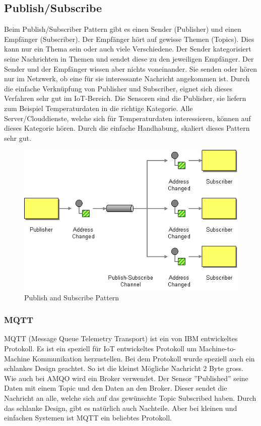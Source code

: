 \subsection{Publish/Subscribe}
Beim Publish/Subscriber Pattern gibt es einen Sender (Publisher) und einen Empfänger (Subscriber). Der Empfänger hört auf gewisse Themen (Topics). Dies kann nur ein Thema sein oder auch viele Verschiedene. Der Sender kategorisiert seine Nachrichten in Themen und sendet diese zu den jeweiligen Empfänger. Der Sender und der Empfänger wissen aber nichts voneinander. Sie senden oder hören nur im Netzwerk, ob eine für sie interessante Nachricht angekommen ist. Durch die einfache Verknüpfung von Publisher und Subscriber, eignet sich dieses Verfahren sehr gut im IoT-Bereich. Die Sensoren sind die Publisher, sie liefern zum Beispiel Temperaturdaten in die richtige Kategorie. Alle Server/Clouddienste, welche sich für Temperaturdaten interessieren, können auf dieses Kategorie hören. Durch die einfache Handhabung, skaliert dieses Pattern sehr gut.
\begin{figure}[H]
\centering
\includegraphics[scale=0.65]{images/publishsubscribe.png}
\caption{Publish and Subscribe Pattern\cite{PublishSubscribePattern}}
\end{figure}
\subsubsection{MQTT}
MQTT (Message Queue Telemetry Transport) ist ein von IBM entwickeltes Protokoll. Es ist ein speziell für IoT entwickeltes Protokoll um Machine-to-Machine Kommunikation herzustellen. Bei dem Protokoll wurde speziell auch ein schlankes Design geachtet. So ist die kleinst Mögliche Nachricht 2 Byte gross. Wie auch bei AMQO wird ein Broker verwendet. Der Sensor ''Published'' seine Daten mit einem Topic und den Daten an den Broker. Dieser sendet die Nachricht an alle, welche sich auf das gewünschte Topic Subscribed haben. Durch das schlanke Design, gibt es natürlich auch Nachteile. Aber bei kleinen und einfachen Systemen ist MQTT ein beliebtes Protokoll.
